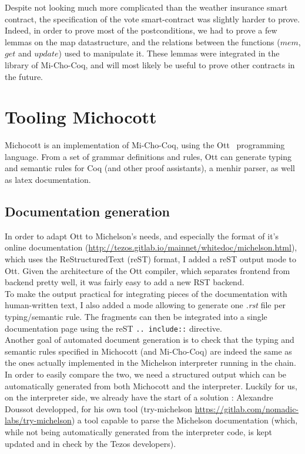 \documentclass{report}
\begin{document}
Despite not looking much more complicated than the weather insurance smart contract, the specification of the vote smart-contract was slightly harder to prove. Indeed, in order to prove most of the postconditions, we had to prove a few lemmas on the map datastructure, and the relations between the functions ($mem$, $get$ and $update$) used to manipulate it. These lemmas were integrated in the library of Mi-Cho-Coq, and will most likely be useful to prove other contracts in the future.


\section{Tooling Michocott}

Michocott is an implementation of Mi-Cho-Coq, using the Ott~\cite{ottLang} programming language. From a set of grammar definitions and rules, Ott can generate typing and semantic rules for Coq (and other proof assistants), a menhir parser, as well as latex documentation.

\subsection{Documentation generation}

In order to adapt Ott to Michelson's needs, and especially the format of it's online documentation (\url{http://tezos.gitlab.io/mainnet/whitedoc/michelson.html}), which uses the ReStructuredText (reST) format, I added a reST output mode to Ott. Given the architecture of the Ott compiler, which separates frontend from backend pretty well, it was fairly easy to add a new RST backend.\\
To make the output practical for integrating pieces of the documentation with human-written text, I also added a mode allowing to generate one \textit{.rst} file per typing/semantic rule. The fragments can then be integrated into a single documentation page using the reST \texttt{.. include::} directive.\\

Another goal of automated document generation is to check that the typing and semantic rules specified in Michocott (and Mi-Cho-Coq) are indeed the same as the ones actually implemented in the Michelson interpreter running in the chain. In order to easily compare the two, we need a structured output which can be automatically generated from both Michocott and the interpreter. Luckily for us, on the interpreter side, we already have the start of a solution : Alexandre Doussot developped, for his own tool (try-michelson \url{https://gitlab.com/nomadic-labs/try-michelson}) a tool capable to parse the Michelson documentation (which, while not being automatically generated from the interpreter code, is kept updated and in check by the Tezos developers).
\end{document}
